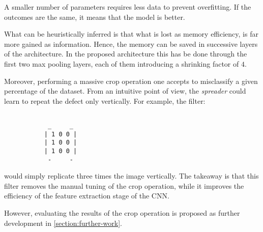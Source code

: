         \par{
            A smaller number of parameters requires less data to prevent overfitting. If the outcomes are the same, it means that the model is better.
        }
        \par{
            What can be heuristically inferred is that what is lost as memory efficiency, is far more gained as information. Hence, the memory can be saved in successive layers of the architecture. In the proposed architecture this has be done through the first two max pooling layers, each of them introducing a shrinking factor of $4$.
        }
        \par{
            Moreover, performing a massive crop operation one accepts to misclassify a given percentage of the dataset. From an intuitive point of view, the \emph{spreader} could learn to repeat the defect only vertically.
            For example, the filter:
        }
        \par{
        \begin{BVerbatim}

            _     _
           | 1 0 0 |
           | 1 0 0 |
           | 1 0 0 |
            -     -
       \end{BVerbatim}
        }
        \par{
            would simply replicate three times the image vertically. The takeaway is that this filter removes the manual tuning of the crop operation, while it improves the efficiency of the feature extraction stage of the CNN.
        }
        \par{
            However, evaluating the results of the crop operation is proposed as further development in \ref{section:further-work}.
        }
